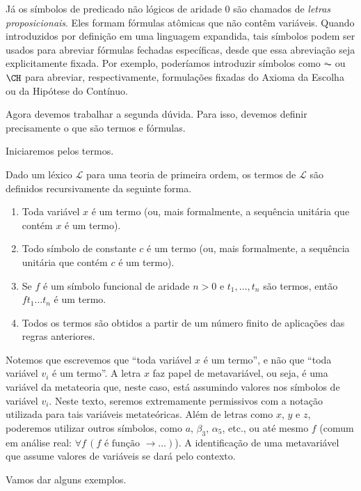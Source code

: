 Já os símbolos de predicado não lógicos de aridade $0$ são chamados de \emph{letras proposicionais}.
Eles formam fórmulas atômicas que não contêm variáveis.
Quando introduzidos por definição em uma linguagem expandida, tais símbolos podem ser usados para abreviar fórmulas fechadas específicas, desde que essa abreviação seja explicitamente fixada.
Por exemplo, poderíamos introduzir símbolos como $\AC$ ou $\CH$ para abreviar, respectivamente, formulações fixadas do Axioma da Escolha ou da Hipótese do Contínuo.

Agora devemos trabalhar a segunda dúvida.
Para isso, devemos definir precisamente o que são termos e fórmulas.

Iniciaremos pelos termos.

\begin{metadefinition}\label{mdef:termosPrimeiraOrdem}
    Dado um léxico $\mathcal L$ para uma teoria de primeira ordem, os termos de $\mathcal L$ são definidos recursivamente da seguinte forma.
\begin{enumerate}[label=(\roman*)]
    \item Toda variável $x$ é um termo (ou, mais formalmente, a sequência unitária que contém $x$ é um termo).
    \item Todo símbolo de constante $c$ é um termo (ou, mais formalmente, a sequência unitária que contém $c$ é um termo).
    \item Se $f$ é um símbolo funcional de aridade $n>0$ e $t_1,\dots,t_n$ são termos, então $ft_1\dots t_n$ é um termo.
    \item Todos os termos são obtidos a partir de um número finito de aplicações das regras anteriores.
\end{enumerate}
\end{metadefinition}
Notemos que escrevemos que ``toda variável $x$ é um termo'', e não que ``toda variável $v_i$ é um termo''.
A letra $x$ faz papel de metavariável, ou seja, é uma variável da metateoria que, neste caso, está assumindo valores nos símbolos de variável $v_i$.
Neste texto, seremos extremamente permissivos com a notação utilizada para tais variáveis metateóricas.
Além de letras como $x$, $y$ e $z$, poderemos utilizar outros símbolos, como $a$, $\beta_3$, $\alpha_5$, etc., ou até mesmo $f$ (comum em análise real: $\forall f\,(f \text{ é função } \rightarrow\dots)$).
A identificação de uma metavariável que assume valores de variáveis se dará pelo contexto.

Vamos dar alguns exemplos.

